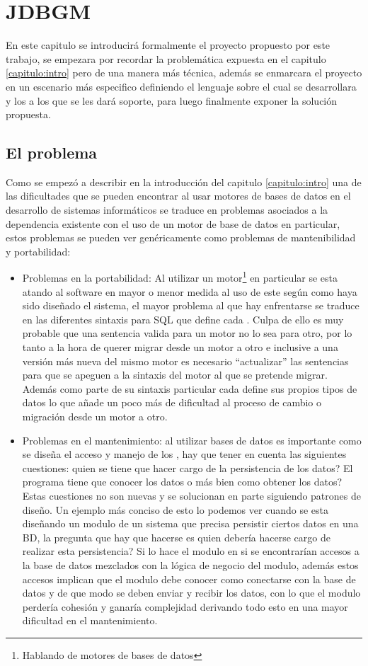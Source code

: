 \chapter{JDBGM}
%
%
En este capitulo se introducirá formalmente el proyecto propuesto por este trabajo, se empezara por recordar la problemática expuesta en el capitulo \ref{capitulo:intro} pero de una manera más técnica, además se enmarcara el proyecto en un escenario más especifico definiendo el lenguaje sobre el cual se desarrollara y los \dd a los que se les dará soporte, para luego finalmente exponer la solución propuesta.
%
\section{El problema}
%
Como se empezó a describir en la introducción del capitulo \ref{capitulo:intro} una de las dificultades que se pueden encontrar al usar motores de bases de datos en el desarrollo de sistemas informáticos se traduce en problemas asociados a la dependencia existente con el uso de un motor de base de datos en particular, estos problemas se pueden ver genéricamente como problemas de mantenibilidad y portabilidad:
%
\begin{itemize}
%
\item Problemas en la portabilidad: Al utilizar un motor\footnote{Hablando de motores de bases de datos} en particular se esta atando al software en mayor o menor medida al uso de este según como haya sido diseñado el sistema, el mayor problema al que hay enfrentarse se traduce en las diferentes sintaxis para SQL que define cada \dd. Culpa de ello es muy probable que una sentencia valida para un motor no lo sea para otro, por lo tanto a la hora de querer migrar desde un motor a otro e inclusive a una versión más nueva del mismo motor es necesario  ``actualizar'' las sentencias para que se apeguen a la sintaxis del motor al que se pretende migrar. Además como parte de su sintaxis particular cada \dd define sus propios tipos de datos lo que añade un poco más de dificultad al proceso de cambio o migración desde un motor a otro.  
%
\item  Problemas en el mantenimiento: al utilizar bases de datos es importante como se diseña el acceso y manejo de los \dd, hay que tener en cuenta las siguientes cuestiones: quien se tiene que hacer cargo de la persistencia de los datos? El programa tiene que conocer los datos o más bien como obtener los datos? Estas cuestiones no son nuevas y se solucionan en parte siguiendo patrones de diseño. Un ejemplo más conciso de esto lo podemos ver cuando se esta diseñando un modulo de un sistema que precisa persistir ciertos datos en una BD, la pregunta que hay que hacerse es quien debería hacerse cargo de realizar esta persistencia? Si lo hace el modulo en si se encontrarían accesos a la base de datos mezclados con la lógica de negocio del modulo, además estos accesos implican que el modulo debe conocer como conectarse con la base de datos y de que modo se deben enviar y recibir los datos, con lo que el modulo	perdería cohesión y ganaría complejidad derivando todo esto en una mayor dificultad en el mantenimiento.
\end{itemize}
